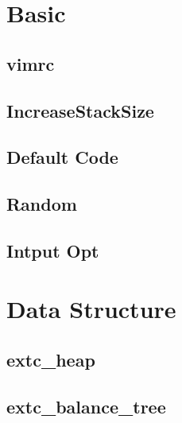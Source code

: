 \documentclass[a4paper,10pt,twocolumn,oneside]{article}
\begin{document}
\pagestyle{fancy}
\fancyfoot{}
\fancyhead[R]{\thepage}
\renewcommand{\headrulewidth}{0.4pt}
\renewcommand{\contentsname}{Contents} 

\scriptsize
\tableofcontents


\section{Basic}
\subsection{vimrc}


\subsection{IncreaseStackSize}


\subsection{Default Code}


\subsection{Random}


\subsection{Intput Opt}


\section{Data Structure}

\subsection{extc\_heap}


\subsection{extc\_balance\_tree}

\end{document}
